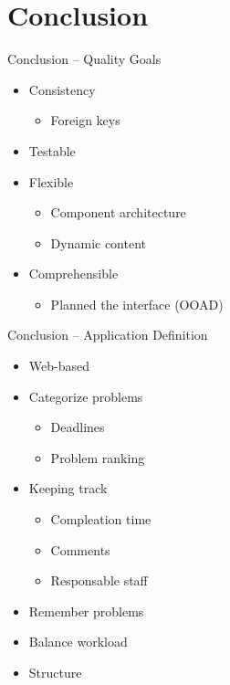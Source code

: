 \section*{Conclusion}
\begin{frame}{Conclusion -- Quality Goals}

\begin{itemize}
	\item Consistency
	\begin{itemize}
		\item Foreign keys
	\end{itemize}
	\item Testable 
	\item Flexible
	\begin{itemize}
		\item Component architecture
		\item Dynamic content
	\end{itemize}
	\item Comprehensible
	\begin{itemize}
		\item Planned the interface (OOAD)
	\end{itemize}
\end{itemize}
\end{frame}

\begin{frame}{Conclusion -- Application Definition}

	\begin{itemize}
	\item Web-based 
	\item Categorize problems
	\begin{itemize}
		\item Deadlines
		\item Problem ranking
	\end{itemize}
	\item Keeping track
	\begin{itemize}
		\item Compleation time
		\item Comments
		\item Responsable staff
	\end{itemize}	
	\item Remember problems
	\item Balance workload
	\item Structure
\end{itemize}
\end{frame}